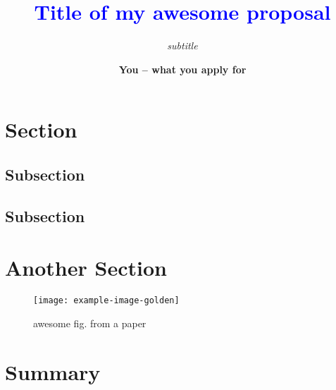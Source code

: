 \documentclass[12pt,letter]{scrartcl}%
\title{\textcolor{blue}{\Large Title of my awesome proposal}\linebreak
   \vspace{-25pt}
 }
\subtitle{\small  \emph{subtitle}}
\author{\normalsize \textbf{You -- what you apply for}}
\date{}
\begin{document}
\maketitle
\vspace*{-50pt}

\section*{Section\,\,}

\lipsum[1-2]

\subsection*{Subsection}

\lipsum[3]

\lipsum[4]

\subsection*{Subsection}

\lipsum[5]

\section*{Another Section}

\begin{wrapfigure}[13]{R}{.45\textwidth}
  \setlength{\abovecaptionskip}{-4pt}
  \centering
  \texttt{[image: example-image-golden]}
  \vspace*{10pt}
  \caption{awesome fig. from a paper \cite{abadie:10}}
\end{wrapfigure}
\lipsum[6-7]

\section*{Summary\,\,}

\lipsum[7]




\def\aj{AJ }
\def\apj{ApJ }
\def\apss{Astrophys. Space Sci.}
\def\apjl{ApJL }
\def\apjs{ApJS }
\def\aa{A\&A }
\def\aap{A\&A }
\def\araa{ARAA }
\def\mnras{MNRAS }
\def\mnrasl{MNRASL }
\def\cqg{Class. Quantum Grav.}
\def\prl{PRL}



\setlength{\bibsep}{0.7pt}
\end{document}
